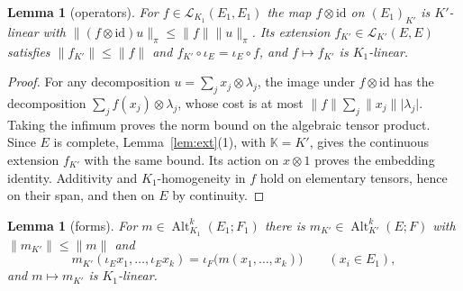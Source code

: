 \documentclass[11pt]{amsart}
\newtheorem{lemma}[theorem]{Lemma}
\theoremstyle{definition}
\theoremstyle{remark}
\numberwithin{equation}{section}
\newcommand{\cL}{\mathcal L}
\newcommand{\Alt}{\operatorname{Alt}}
\newcommand{\id}{\mathrm{id}}
\newcommand{\abs}[1]{\lvert #1\rvert}
\newcommand{\norm}[1]{\lVert #1\rVert}
\theoremstyle{plain}
\theoremstyle{definition}
\theoremstyle{plain}
\begin{document}
\begin{lemma}[operators]\label{lem:ops}
For $f\in\cL_{K_1}(E_1,E_1)$ the map $f\otimes\id$ on $(E_1)_{K'}$ is $K'$\nobreakdash-linear with
$\norm{(f\otimes\id)u}_\pi\le\norm f\norm u_\pi$. Its extension $f_{K'}\in\cL_{K'}(E,E)$ satisfies $\norm{f_{K'}}\le\norm f$
and $f_{K'}\circ\iota_E=\iota_E\circ f$, and $f\mapsto f_{K'}$ is $K_1$\nobreakdash-linear.
\end{lemma}

\begin{proof}
For any decomposition $u=\sum_jx_j\otimes\lambda_j$, the image under $f\otimes\id$ has the decomposition
$\sum_jf(x_j)\otimes\lambda_j$, whose cost is at most
$\norm f\sum_j\norm{x_j}\abs{\lambda_j}$. Taking the infimum proves the norm bound on the algebraic tensor product.
Since $E$ is complete, Lemma~\ref{lem:ext}(1), with $\mathbb K=K'$, gives the continuous extension $f_{K'}$ with the
same bound. Its action on $x\otimes1$ proves the embedding identity. Additivity and $K_1$\nobreakdash-homogeneity in
$f$ hold on elementary tensors, hence on their span, and then on $E$ by continuity.
\end{proof}

\begin{lemma}[forms]\label{lem:forms-bc}
For $m\in\Alt^k_{K_1}(E_1;F_1)$ there is $m_{K'}\in\Alt^k_{K'}(E;F)$ with $\norm{m_{K'}}\le\norm m$ and
\[
m_{K'}(\iota_Ex_1,\dots,\iota_Ex_k)=\iota_F\bigl(m(x_1,\dots,x_k)\bigr)\qquad(x_i\in E_1),
\]
and $m\mapsto m_{K'}$ is $K_1$\nobreakdash-linear.
\end{lemma}
\end{document}
